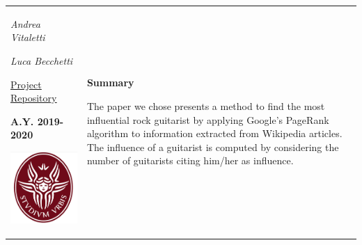\documentclass[12pt, twoside]{article}
\begin{document}
\begin{titlepage}
\begin{tabular}{p{6cm} p{10cm}}
\textrm{\textit{Andrea Vitaletti}}
\par\medskip
\textrm{\textit{Luca Becchetti}}

\vspace{15pt}
\href{https://github.com/LucaTomei/Computer_Scrientists}{\underline{Project Repository}}

\vspace{2cm} 
\par\medskip
\begin{center}
\textbf{A.Y. 2019-2020}
\end{center}



\includegraphics[scale=0.4]{images/logo.png}
&

\textbf{Summary}	%
\par\medskip
The paper we chose presents a method to find the most influential rock guitarist by applying Google’s PageRank algorithm to information extracted from Wikipedia articles. The influence of a guitarist is computed by considering the number of guitarists citing him/her as influence.
\linebreak


\end{tabular}
\end{titlepage}
\end{document}
